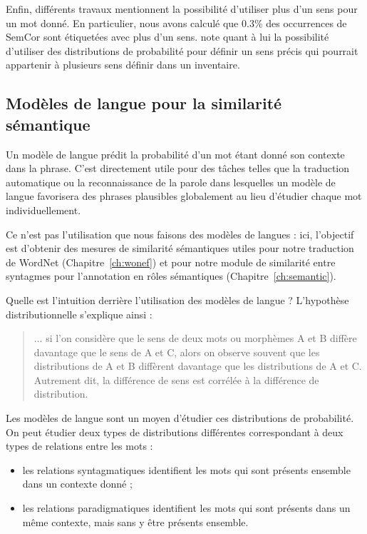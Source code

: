 Enfin, différents travaux mentionnent la possibilité d'utiliser plus d'un sens
pour un mot donné.
En particulier, nous avons calculé que 0.3\% des occurrences de SemCor sont
étiquetées avec plus d'un sens. \cite{smith2011rumble} note quant à lui la
possibilité d'utiliser des distributions de probabilité pour définir un sens
précis qui pourrait appartenir à plusieurs sens définir dans un inventaire.


\subsection{Modèles de langue pour la similarité sémantique}
\label{subsec:modeles_de_langue}

Un modèle de langue prédit la probabilité d'un mot étant donné son contexte
dans la phrase. C'est directement utile pour des tâches telles que la
traduction automatique ou la reconnaissance de la parole dans lesquelles un
modèle de langue favorisera des phrases plausibles globalement au lieu
d'étudier chaque mot individuellement.

Ce n'est pas l'utilisation que nous faisons des modèles de langues : ici,
l'objectif est d'obtenir des mesures de similarité sémantiques utiles pour
notre traduction de WordNet (Chapitre~\ref{ch:wonef}) et pour notre module de
similarité entre syntagmes pour l'annotation en rôles sémantiques
(Chapitre~\ref{ch:semantic}).

Quelle est l'intuition derrière l'utilisation des modèles de langue ?
L'hypothèse distributionnelle s'explique ainsi
\cite[p.~786]{harris1954distributional} :

\begin{quote} ... si l'on considère que le sens de deux mots ou morphèmes A et B
    diffère davantage que le sens de A et C, alors on observe souvent que les
    distributions de A et B diffèrent davantage que les distributions de A et C.
    Autrement dit, la différence de sens est corrélée à la différence de
    distribution. \end{quote}

Les modèles de langue sont un moyen d'étudier ces distributions de probabilité.
On peut étudier deux types de distributions différentes correspondant à deux
types de relations entre les mots \citep{sahlgren2008distributional} :

\begin{itemize}
    \item les relations syntagmatiques identifient les mots qui sont présents
        ensemble dans un contexte donné ;
    \item les relations paradigmatiques identifient les mots qui sont présents
        dans un même contexte, mais sans y être présents ensemble.
\end{itemize}

